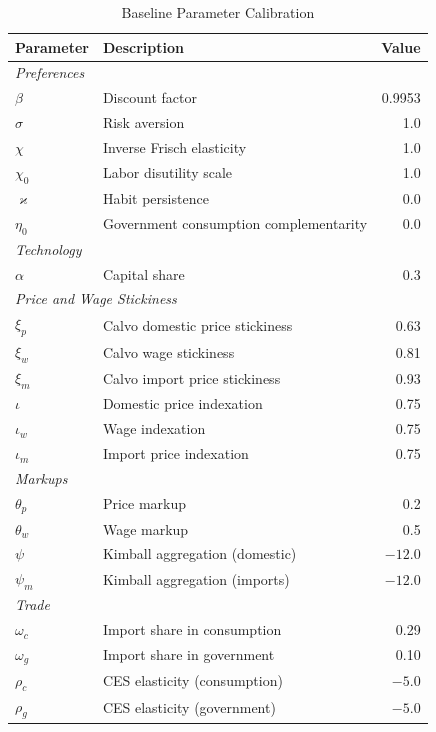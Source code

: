 \documentclass[12pt]{article}
\begin{document}
\begin{table}[htbp]
\centering
\caption{Baseline Parameter Calibration}\label{tab:calibration}
\begin{singlespace}
\begingroup
\renewcommand{\arraystretch}{0.9}
\footnotesize
\begin{tabular}{llr}
\toprule
\textbf{Parameter} & \textbf{Description} & \textbf{Value} \\
\midrule
\multicolumn{3}{l}{\textit{Preferences}} \\
$\beta$ & Discount factor & 0.9953 \\
$\sigma$ & Risk aversion & 1.0 \\
$\chi$ & Inverse Frisch elasticity & 1.0 \\
$\chi_0$ & Labor disutility scale & 1.0 \\
$\varkappa$ & Habit persistence & 0.0 \\
$\eta_0$ & Government consumption complementarity & 0.0 \\
\midrule
\multicolumn{3}{l}{\textit{Technology}} \\
$\alpha$ & Capital share & 0.3 \\
\midrule
\multicolumn{3}{l}{\textit{Price and Wage Stickiness}} \\
$\xi_p$ & Calvo domestic price stickiness & 0.63 \\
$\xi_w$ & Calvo wage stickiness & 0.81 \\
$\xi_m$ & Calvo import price stickiness & 0.93 \\
$\iota$ & Domestic price indexation & 0.75 \\
$\iota_w$ & Wage indexation & 0.75 \\
$\iota_m$ & Import price indexation & 0.75 \\
\midrule
\multicolumn{3}{l}{\textit{Markups}} \\
$\theta_p$ & Price markup & 0.2 \\
$\theta_w$ & Wage markup & 0.5 \\
$\psi$ & Kimball aggregation (domestic) & $-12.0$ \\
$\psi_m$ & Kimball aggregation (imports) & $-12.0$ \\
\midrule
\multicolumn{3}{l}{\textit{Trade}} \\
$\omega_c$ & Import share in consumption & 0.29 \\
$\omega_g$ & Import share in government & 0.10 \\
$\rho_c$ & CES elasticity (consumption) & $-5.0$ \\
$\rho_g$ & CES elasticity (government) & $-5.0$ \\

\end{tabular}
\end{singlespace}
\end{table}
\end{document}
